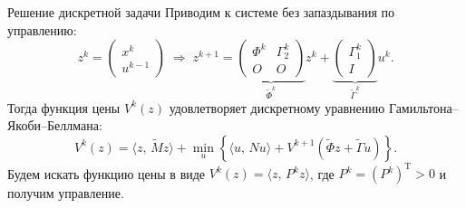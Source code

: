         \begin{frame}{Решение дискретной задачи}
                Приводим к системе без запаздывания по управлению:
                \begin{equation*}
                        z^k
                        =
                        \begin{pmatrix}
                                x^k \\ u^{k-1}
                        \end{pmatrix}
                        \;\Longrightarrow\;
                        z^{k+1}
                        =
                        \underbrace{
                                \begin{pmatrix}
                                        \Phi^k & \Gamma_2^k\\
                                        O & O
                                \end{pmatrix}
                        }_{\tilde \Phi^k}
                        z^k + \underbrace{
                                \begin{pmatrix}
                                        \Gamma_1^k \\ I
                                \end{pmatrix}
                        }_{\tilde\Gamma^k} u^k.
                \end{equation*}
                Тогда функция цены $V^k(z)$ удовлетворяет дискретному уравнению Гамильтона--Якоби--Беллмана:
                \begin{equation*}
                        V^k(z) = \langle z,\,\tilde M z\rangle
                        +
                        \min\limits_{u}
                        \left\{
                        \langle
                        u,\,N u
                        \rangle
                        +
                        V^{k+1}(\tilde\Phi z + \tilde\Gamma u)
                        \right\}.
                \end{equation*}
                Будем искать функцию цены в виде $V^k(z) = \langle z,\,P^k z \rangle$, где $P^k = (P^k)^{\mathrm{T}} > 0$ и получим управление.
        \end{frame}
